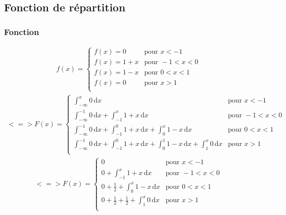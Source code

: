 \documentclass{article}
\begin{document}
\paragraph{}

\newpage

\subsection{Fonction de répartition}

\subsubsection{Fonction}

\begin{align}
f(x)=\left\{
	\begin{array}{llll}
		f(x)=0 &\mbox{pour } x<-1\\
		f(x)=1+x & \mbox{pour } -1<x<0 \\
		f(x)=1-x & \mbox{pour } 0<x<1 \\
		f(x)=0 & \mbox{pour } x>1 \\
	\end{array}
\right. 
\end{align}
\begin{align}
<=>
F(x)=\left\{
	\begin{array}{llll}
		\displaystyle \int_{- \infty }^{x} 0 \, \mathrm{d}x &\mbox{pour } x<-1\\
		\displaystyle \int_{- \infty }^{-1} 0 \, \mathrm{d}x+\displaystyle \int_{-1 }^{x} 1+x \, \mathrm{d}x &\mbox{pour } -1<x<0\\
		\displaystyle \int_{- \infty }^{-1} 0 \, \mathrm{d}x+\displaystyle \int_{-1 }^{0} 1+x \, \mathrm{d}x + \displaystyle \int_{0}^{x} 1-x \, \mathrm{d}x &\mbox{pour } 0<x<1\\
		\displaystyle \int_{- \infty }^{-1} 0 \, \mathrm{d}x+\displaystyle \int_{-1 }^{0} 1+x \, \mathrm{d}x + \displaystyle \int_{0}^{1} 1-x \, \mathrm{d}x+\displaystyle \int_{1}^{x} 0 \, \mathrm{d}x &\mbox{pour } x>1\\
	\end{array}
\right. 
\end{align}
\begin{align}
<=>
F(x)=\left\{
	\begin{array}{llll}
		0 &\mbox{pour } x<-1\\
		0 + \displaystyle \int_{-1 }^{x} 1+x \, \mathrm{d}x &\mbox{pour } -1<x<0\\
		0+\frac{1}{2}+\displaystyle \int_{0}^{x} 1-x \, \mathrm{d}x &\mbox{pour } 0<x<1\\
		0+\frac{1}{2}+\frac{1}{2}+\displaystyle \int_{1}^{x} 0 \, \mathrm{d}x &\mbox{pour } x>1\\
	\end{array}
\right. 
\end{align}
\end{document}
